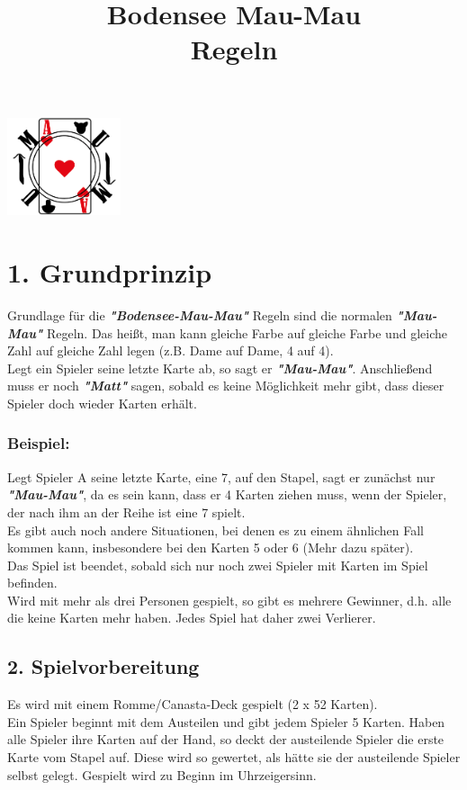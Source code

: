 \documentclass{article}
\title{Bodensee Mau-Mau \\ Regeln}
\begin{document}
\maketitle
\begin{center}
\includegraphics[width=0.25\textwidth]{photos/logo.png}
\end{center}

\section*{1. Grundprinzip}
Grundlage für die \textit{\textbf{"Bodensee-Mau-Mau"}} Regeln sind die normalen \textit{\textbf{"Mau-Mau"}} Regeln. Das heißt, man kann gleiche Farbe auf gleiche Farbe und gleiche Zahl auf gleiche Zahl legen (z.B. Dame auf
Dame, 4 auf 4). \\
Legt ein Spieler seine letzte Karte ab, so sagt er \textit{\textbf{"Mau-Mau"}}. Anschließend muss er noch  \textbf{\textit{"Matt"}} sagen, sobald es keine Möglichkeit mehr gibt, dass dieser Spieler doch wieder Karten erhält.
\subsubsection*{Beispiel:}
Legt Spieler A seine letzte Karte, eine 7, auf den Stapel, sagt er zunächst nur \textit{\textbf{"Mau-Mau"}}, da es sein kann, dass er 4 Karten ziehen muss, wenn der Spieler, der nach ihm an der Reihe ist eine 7 spielt. \\
Es gibt auch noch andere Situationen, bei denen es zu einem ähnlichen Fall kommen kann, insbesondere bei den Karten 5 oder 6 (Mehr dazu später). \\
Das Spiel ist beendet, sobald sich nur noch zwei Spieler mit Karten im Spiel befinden. \\ Wird mit mehr als drei Personen gespielt, so gibt es mehrere Gewinner, d.h. alle die keine Karten mehr haben. Jedes Spiel hat daher zwei Verlierer.
\subsection*{2. Spielvorbereitung}
Es wird mit einem Romme/Canasta-Deck gespielt (2 x 52 Karten). \\ Ein Spieler beginnt mit dem Austeilen und gibt jedem Spieler 5 Karten. Haben alle Spieler ihre Karten auf der Hand, so deckt der austeilende Spieler die erste Karte vom Stapel auf. Diese wird so gewertet, als hätte sie der austeilende Spieler selbst gelegt. Gespielt wird zu Beginn im Uhrzeigersinn. \\
\end{document}
